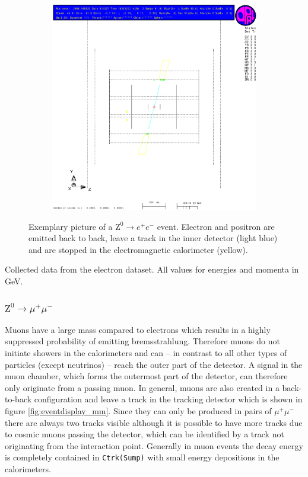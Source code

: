 \documentclass[11pt, a4paper]{article}
\numberwithin{equation}{section}
\begin{document}
\begin{figure}[h]
\ContinuedFloat
	\begin{subfigure}{\textwidth}
		\centering
		\includegraphics[width=.9\textwidth]{./data/tag1/ee_pics/cropped/ee_02_side}
	\end{subfigure}
	\caption{Exemplary picture of a $\mathrm{Z}^0\rightarrow e^+e^-$ event. Electron and positron are emitted back to back, leave a track in the inner detector (light blue) and are stopped in the electromagnetic calorimeter (yellow).}
	\label{fig:eventdisplay_ee}
\end{figure}
\begin{table}
	\centering
	
	\caption{Collected data from the electron dataset. All values for energies and momenta in \si{GeV}.}
	\label{tab:eventdisplay_ee}
\end{table}
\clearpage

\subsubsection{$\mathrm{Z}^0\rightarrow \mu^+\mu^-$}
Muons have a large mass compared to electrons which results in a highly suppressed probability of emitting bremsstrahlung.
Therefore muons do not initiate showers in the calorimeters and can -- in contrast to all other types of particles (except neutrinos) -- reach the outer part of the detector.
A signal in the muon chamber, which forms the outermost part of the detector, can therefore only originate from a passing muon.
In general, muons are also created in a back-to-back configuration and leave a track in the tracking detector which is shown in figure \ref{fig:eventdisplay_mm}.
Since they can only be produced in pairs of $\mu^+\mu^-$ there are always two tracks visible although it is possible to have more tracks due to cosmic muons passing the detector, which can be identified by a track not originating from the interaction point.
Generally in muon events the decay energy is completely contained in \texttt{Ctrk(Sump)} with small energy depositions in the calorimeters.
\end{document}
